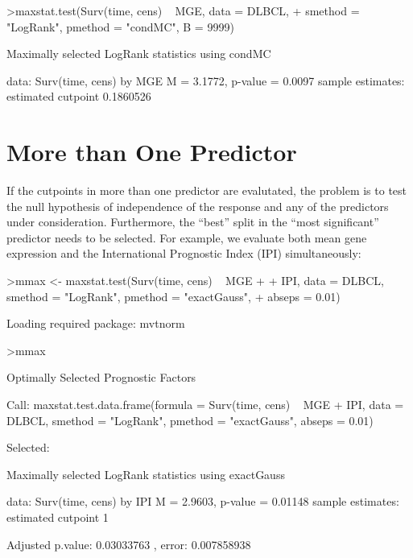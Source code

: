 \documentclass{article}
\renewcommand{\baselinestretch}{1.5}
\begin{document}
\begin{Schunk}
\begin{Sinput}
>maxstat.test(Surv(time, cens) ~ MGE, data = DLBCL, 
+     smethod = "LogRank", pmethod = "condMC", B = 9999)
\end{Sinput}
\begin{Soutput}
	Maximally selected LogRank statistics using condMC

data:  Surv(time, cens) by MGE 
M = 3.1772, p-value = 0.0097
sample estimates:
estimated cutpoint 
         0.1860526 
\end{Soutput}
\end{Schunk}



\section{More than One Predictor}

If the cutpoints in more than one predictor are evalutated, the problem is
to test the null hypothesis of independence of the response and any of the
predictors under consideration. Furthermore, the ``best'' split in the
``most significant'' predictor needs to be selected. For example, we
evaluate both mean gene expression and the International Prognostic Index
(IPI) simultaneously:

\renewcommand{\baselinestretch}{1}
\begin{Schunk}
\begin{Sinput}
>mmax <- maxstat.test(Surv(time, cens) ~ MGE + 
+     IPI, data = DLBCL, smethod = "LogRank", pmethod = "exactGauss", 
+     abseps = 0.01)
\end{Sinput}
\begin{Soutput}
Loading required package: mvtnorm 
\end{Soutput}
\begin{Sinput}
>mmax
\end{Sinput}
\begin{Soutput}
	 Optimally Selected Prognostic Factors 

Call: maxstat.test.data.frame(formula = Surv(time, cens) ~ MGE + IPI, 
    data = DLBCL, smethod = "LogRank", pmethod = "exactGauss", 
    abseps = 0.01)


 Selected: 

	Maximally selected LogRank statistics using
	exactGauss

data:  Surv(time, cens) by IPI 
M = 2.9603, p-value = 0.01148
sample estimates:
estimated cutpoint 
                 1 

Adjusted p.value: 
0.03033763 , error:  0.007858938 
\end{Soutput}
\end{Schunk}
\renewcommand{\baselinestretch}{1.5}
\end{document}
